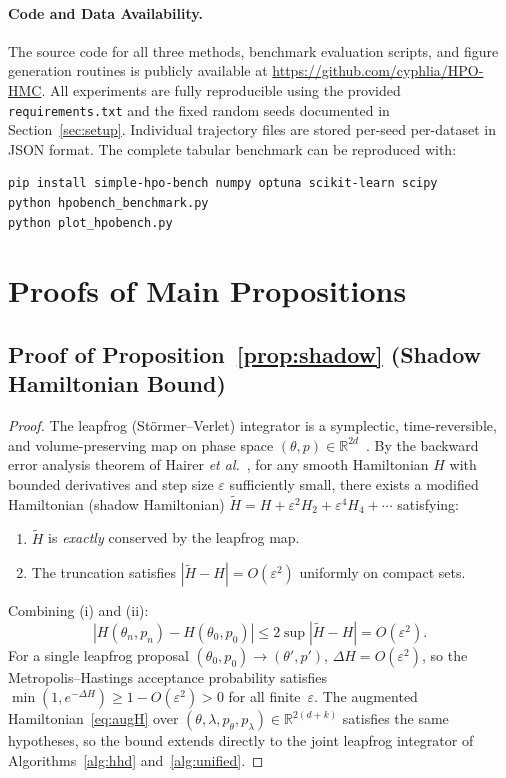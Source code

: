 \documentclass[11pt]{article}
\theoremstyle{definition}
\newcommand{\tHH}{\widetilde{H}}
\begin{document}
\paragraph{Code and Data Availability.}
The source code for all three methods, benchmark evaluation scripts,
and figure generation routines is publicly available at
\url{https://github.com/cyphlia/HPO-HMC}.
All experiments are fully reproducible using the provided
\texttt{requirements.txt} and the fixed random seeds documented in
Section~\ref{sec:setup}. Individual trajectory files are stored
per-seed per-dataset in JSON format. The complete tabular benchmark
can be reproduced with:
\begin{verbatim}
pip install simple-hpo-bench numpy optuna scikit-learn scipy
python hpobench_benchmark.py
python plot_hpobench.py
\end{verbatim}


\appendix

\section{Proofs of Main Propositions}
\label{app:proofs}

\subsection{Proof of Proposition~\ref{prop:shadow} (Shadow Hamiltonian Bound)}

\begin{proof}
The leapfrog (St\"{o}rmer--Verlet) integrator is a symplectic,
time-reversible, and volume-preserving map on phase space
$(\theta,p)\in\mathbb{R}^{2d}$~\cite[Ch.~VI]{hairer2006}.
By the backward error analysis theorem of Hairer \emph{et
al.}~\cite[Thm.~IX.3.1]{hairer2006}, for any smooth Hamiltonian
$H$ with bounded derivatives and step size $\varepsilon$ sufficiently
small, there exists a modified Hamiltonian (shadow Hamiltonian)
$\tHH = H + \varepsilon^2 H_2 + \varepsilon^4 H_4 + \cdots$ satisfying:
\begin{enumerate}[label=(\roman*)]
  \item $\tHH$ is \emph{exactly} conserved by the leapfrog map.
  \item The truncation satisfies
        $|\tHH - H| = O(\varepsilon^2)$ uniformly on compact sets.
\end{enumerate}
Combining (i) and (ii):
\[
  |H(\theta_n,p_n) - H(\theta_0,p_0)|
  \le 2\sup|\tHH - H| = O(\varepsilon^2).
\]
For a single leapfrog proposal $(\theta_0,p_0) \to (\theta',p')$,
$\Delta H = O(\varepsilon^2)$, so the Metropolis--Hastings
acceptance probability satisfies
$\min(1,e^{-\Delta H}) \ge 1 - O(\varepsilon^2) > 0$
for all finite~$\varepsilon$.
The augmented Hamiltonian~\eqref{eq:augH} over
$(\theta,\lambda,p_\theta,p_\lambda)\in\mathbb{R}^{2(d+k)}$ satisfies
the same hypotheses, so the bound extends directly to the joint
leapfrog integrator of Algorithms~\ref{alg:hhd} and~\ref{alg:unified}.
\end{proof}
\end{document}
